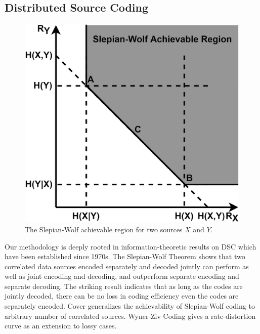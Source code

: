 \documentclass[10pt,twocolumn,letterpaper]{article}
\begin{document}
\subsection{Distributed Source Coding}

\begin{figure}[t]
\begin{center}
\includegraphics[width=0.8\linewidth]{figure/SlepianWolf.eps}
\end{center}
   \caption{The Slepian-Wolf achievable region for two sources $X$ and $Y$.}
\label{fig_2}
\end{figure}
Our methodology is deeply rooted in information-theoretic results on DSC which have been established since 1970s. The Slepian-Wolf \cite{slepian1973noiseless} Theorem shows that two correlated data sources encoded separately and decoded jointly can perform as well as joint encoding and decoding, and outperform separate encoding and separate decoding. The striking result indicates that as long as the codes are jointly decoded, there can be no loss in coding efficiency even the codes are separately encoded. Cover \cite{cover1975proof} generalizes the achievability of Slepian-Wolf coding to arbitrary number of correlated sources. Wyner-Ziv Coding \cite{wyner1976rate} gives a rate-distortion curve as an extension to lossy cases.
\end{document}
